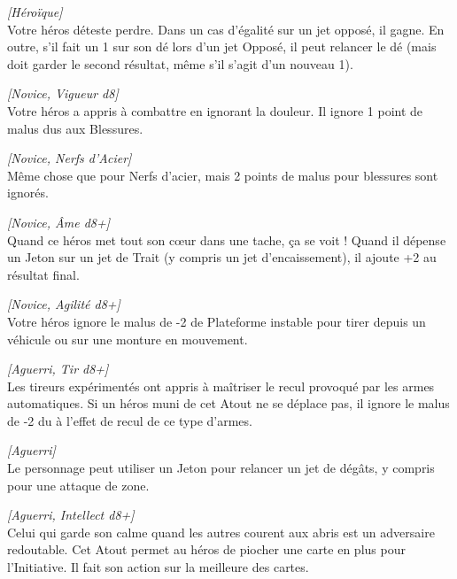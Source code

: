 \begin{description}[align=left]
    \item [Instinct de tueur]
    	\emph{[Héroïque]}\\
        Votre héros déteste perdre. Dans un cas d’égalité sur un jet opposé, il gagne. En outre, s’il fait un 1 sur son dé lors d’un jet Opposé, il peut relancer le dé (mais doit garder le second résultat, même s’il s’agit d’un nouveau 1).

    \item [Nerfs d’acier]
        \emph{[Novice, Vigueur d8]}\\
        Votre héros a appris à combattre en ignorant la douleur. Il ignore 1 point de malus dus aux Blessures.

    \item [Nerfs d’acier trempés]
    	\emph{[Novice, Nerfs d’Acier]}\\
        Même chose que pour Nerfs d’acier, mais 2 points de malus pour blessures sont ignorés.

    \item [Panache]
    	\emph{[Novice, \^Ame d8+]}\\
        Quand ce héros met tout son c\oe{ur} dans une tache, ça se voit ! Quand il dépense un Jeton sur un jet de Trait (y compris un jet d’encaissement), il ajoute +2 au résultat final.

    \item [Poigne ferme]
    	\emph{[Novice, Agilité d8+]}\\
        Votre héros ignore le malus de -2 de Plateforme instable pour tirer depuis un véhicule ou sur une monture en mouvement.

    \item [Rock’n’rolla]
    	\emph{[Aguerri, Tir d8+]}\\
        Les tireurs expérimentés ont appris à maîtriser le recul provoqué par les armes automatiques. Si un héros muni de cet Atout ne se déplace pas, il ignore le malus de -2 du à l’effet de recul de ce type d’armes.

    \item [Sans pitié]
    	\emph{[Aguerri]}\\
        Le personnage peut utiliser un Jeton pour relancer un jet de dégâts, y compris pour une attaque de zone.

    \item [Tête froide]
    	\emph{[Aguerri, Intellect d8+]}\\
        Celui qui garde son calme quand les autres courent aux abris est un adversaire redoutable. Cet Atout permet au héros de piocher une carte en plus pour l’Initiative. Il fait son action sur la meilleure des cartes.


\end{description}
